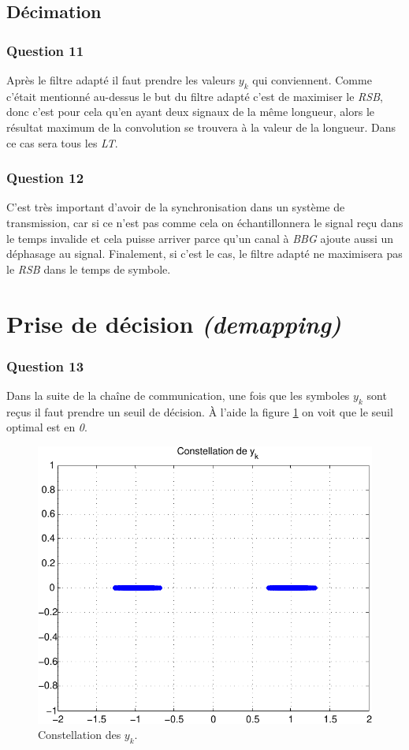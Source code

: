 \documentclass[a4paper,11pt]{article}
\begin{document}
\subsection{Décimation}
\subsubsection*{Question 11}
Après le filtre adapté il faut prendre les valeurs $y_k$ qui conviennent. Comme c'était mentionné au-dessus le but du filtre adapté c'est de maximiser le \emph{RSB}, donc c'est pour cela qu'en ayant deux signaux de la même longueur, alors le résultat maximum de la convolution se trouvera à la valeur de la longueur. Dans ce cas sera tous les \emph{LT}. 
\subsubsection*{Question 12}
C'est très important d'avoir de la synchronisation dans un système de transmission, car si ce n'est pas comme cela on échantillonnera le signal reçu dans le temps invalide et cela puisse arriver parce qu'un canal à \emph{BBG} ajoute aussi un déphasage au signal. Finalement, si c'est le cas, le filtre adapté ne maximisera pas le \emph{RSB} dans le temps de symbole.\section{Prise de décision \emph{(demapping)}}
\subsubsection*{Question 13}
Dans la suite de la chaîne de communication, une fois que les symboles $y_k$ sont reçus il faut prendre un seuil de décision. À l'aide la figure \ref{fig:q13} on voit que le seuil optimal est en \emph{0}. 
\begin{figure}
	\begin{center}
	\includegraphics[scale=1]{Q13-crop.pdf}
	\caption{Constellation des $y_k$.}
	\label{fig:q13}
	\end{center}
\end{figure}  
\end{document}
